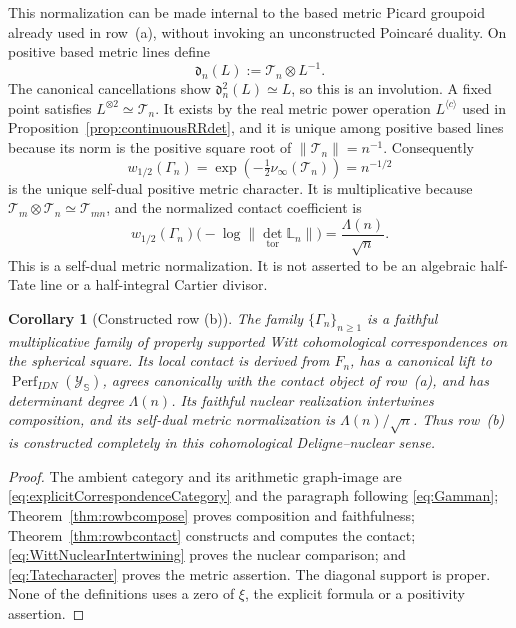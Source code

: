 \documentclass[11pt]{amsart}
\newtheorem{corollary}[theorem]{Corollary}
\theoremstyle{definition}
\theoremstyle{remark}
\begin{document}
This normalization can be made internal to the based metric Picard
groupoid already used in row~(a), without invoking an unconstructed
Poincar\'e duality.  On positive based metric lines define
\[
 \mathfrak d_n(L):=\mathcal T_n\otimes L^{-1}.
\]
The canonical cancellations show
$\mathfrak d_n^2(L)\simeq L$, so this is an involution.  A fixed point
satisfies $L^{\otimes2}\simeq\mathcal T_n$.  It exists by the real metric
power operation $L^{\langle c\rangle}$ used in
Proposition~\ref{prop:continuousRRdet}, and it is unique among positive
based lines because its norm is the positive square root of
$\|\mathcal T_n\|=n^{-1}$.  Consequently
\begin{equation}\label{eq:Tatecharacter}
 w_{1/2}(\Gamma_n)=
 \exp\!\left(-\tfrac12\nu_\infty(\mathcal T_n)\right)=n^{-1/2}
\end{equation}
is the unique self-dual positive metric character.  It is multiplicative
because $\mathcal T_m\otimes\mathcal T_n\simeq\mathcal T_{mn}$, and the
normalized contact coefficient is
\begin{equation}\label{eq:centralLocalCoefficient}
 w_{1/2}(\Gamma_n)
 \bigl(-\log\|\det_{\mathrm{tor}}\mathbb L_n\|\bigr)
 =\frac{\Lambda(n)}{\sqrt n}.
\end{equation}
This is a self-dual metric normalization.  It is not asserted to be an
algebraic half-Tate line or a half-integral Cartier divisor.

\begin{corollary}[Constructed row (b)]\label{cor:rowb}
The family $\{\Gamma_n\}_{n\geq1}$ is a faithful multiplicative family of
properly supported Witt cohomological correspondences on the spherical
square.  Its local contact is derived from $F_n$, has a canonical lift to
$\operatorname{Perf}_{IDN}(\mathscr Y_{\mathbb S})$, agrees canonically
with the contact object of row~(a), and has determinant degree
$\Lambda(n)$.  Its faithful nuclear realization intertwines composition,
and its self-dual metric normalization is $\Lambda(n)/\sqrt n$.  Thus
row~(b) is constructed completely in this cohomological
Deligne--nuclear sense.
\end{corollary}

\begin{proof}
The ambient category and its arithmetic graph-image are
\eqref{eq:explicitCorrespondenceCategory} and the paragraph following
\eqref{eq:Gamman};
Theorem~\ref{thm:rowbcompose} proves composition and faithfulness;
Theorem~\ref{thm:rowbcontact} constructs and computes the contact;
\eqref{eq:WittNuclearIntertwining} proves the nuclear comparison; and
\eqref{eq:Tatecharacter} proves the metric assertion.  The diagonal support
is proper.  None of the definitions uses a zero of $\xi$, the explicit
formula or a positivity assertion.
\end{proof}
\end{document}

